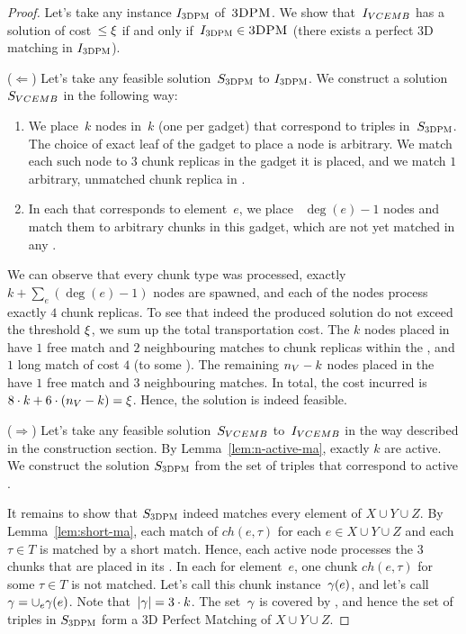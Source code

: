 \begin{proof}
  
  Let's take any instance $I_{\textsc{3DPM}}$ of~$\textsc{3DPM}$.
  We show that~$I_{VCEMB}$ has a solution of cost~$\leq \xi$ if and only if~$I_{\textsc{3DPM}} \in \textsc{3DPM}$ (there exists a perfect 3D matching in $I_{\textsc{3DPM}}$).

  ($\Leftarrow$) Let's take any feasible solution~$S_{\textsc{3DPM}}$ to $I_{\textsc{3DPM}}$.
  We construct a solution~$S_{VCEMB}$ in the following way:
  \begin{enumerate}
    \item We place~$k$ nodes in~$k$ {\TripleGadgets} (one per gadget) that correspond to triples in~$S_{\textsc{3DPM}}$.
    The choice of exact leaf of the gadget to place a node is arbitrary.
    We match each such node to $3$ chunk replicas in the gadget it is placed, and we match $1$ arbitrary, unmatched chunk replica in {\UnqSubtree}.
    \item In each {\ElGadget} that corresponds to element~$e$, we place
   ~$\deg(e) - 1$ nodes and match them to arbitrary chunks in this
    gadget, which are not yet matched in any {\TripleGadget}.
  \end{enumerate}

  We can observe that every chunk type was processed, exactly $k + \sum_e(\deg(e) - 1)$ nodes are spawned, and each of the nodes process exactly $4$ chunk replicas.
  To see that indeed the produced solution do not exceed the threshold $\xi$, we sum up the total transportation cost.
  The $k$ nodes placed in \TripleGadgets{} have $1$ free match and $2$ neighbouring matches to chunk replicas within the \TripleGadget{}, and $1$ long match of cost $4$ (to some \UnqGadget{}).
  The remaining $n_V-k$ nodes placed in the \CoverSubtree{} have $1$ free match and $3$ neighbouring matches.
  In total, the cost incurred is $8\cdot k + 6\cdot (n_V - k) = \xi$.
  Hence, the solution is indeed feasible.

  ($\Rightarrow$) Let's take any feasible solution~$S_{VCEMB}$ to~$I_{VCEMB}$ in the way described in the construction section.
  By Lemma~\ref{lem:n-active-ma}, exactly $k$ \TripleGadgets{} are active.
  We construct the solution $S_{\textsc{3DPM}}$ from the set of triples that correspond to active \TripleGadgets{}.

  It remains to show that $S_{\textsc{3DPM}}$ indeed matches every element of $X\cup Y\cup Z$.
  By Lemma~\ref{lem:short-ma}, each match of $ch(e, \tau)$ for each $e\in X\cup Y\cup Z$ and each $\tau \in T$ is matched by a short match.
  Hence, each active node processes the 3 chunks that are placed in its \TripleGadget.
  In each {\ElGadget} for element~$e$, one chunk $ch(e, \tau)$ for some $\tau \in T$ is not matched.
  Let's call this chunk instance~$\gamma(e)$, and let's call~$\gamma = \cup_e \gamma(e)$.
  Note that~$|\gamma| = 3\cdot k$.
  The set~$\gamma$ is covered by \ActiveNodes{}, and hence the set of triples in $S_{\textsc{3DPM}}$ form a 3D Perfect Matching of $X\cup Y\cup Z$.
\end{proof}


